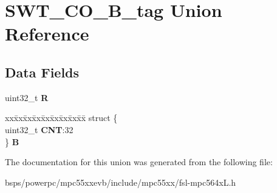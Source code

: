 \hypertarget{unionSWT__CO__32B__tag}{}\section{S\+W\+T\+\_\+\+C\+O\+\_\+B\+\_\+tag Union Reference}
\label{unionSWT__CO__32B__tag}
\subsection*{Data Fields}
\begin{DoxyCompactItemize}
\item 
\mbox{\label{unionSWT__CO__32B__tag_ab430e8829f99424a9fde5762615ebb49}} 
uint32\+\_\+t {\bfseries R}
\item 
\mbox{\label{unionSWT__CO__32B__tag_af3ea3fb5c58f23a69325a0b0f1da5aa9}} 
\begin{tabbing}
xx\=xx\=xx\=xx\=xx\=xx\=xx\=xx\=xx\=\kill
struct \{\\
\>uint32\_t {\bfseries CNT}:32\\
\} {\bfseries B}\\

\end{tabbing}\end{DoxyCompactItemize}


The documentation for this union was generated from the following file\+:\begin{DoxyCompactItemize}
\item 
bsps/powerpc/mpc55xxevb/include/mpc55xx/fsl-\/mpc564x\+L.\+h\end{DoxyCompactItemize}
